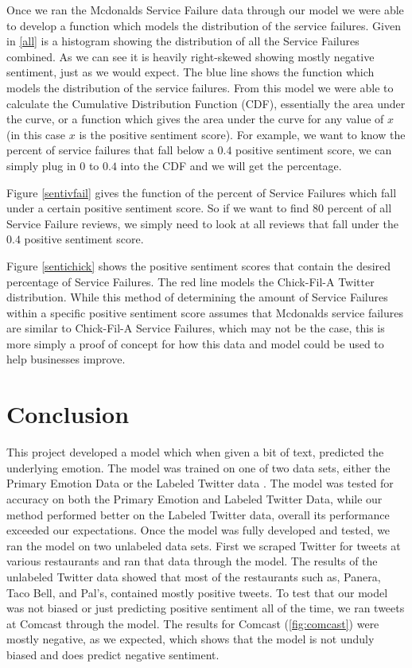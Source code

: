 \documentclass[titlepage,letterpaper]{article}
\begin{document}
Once we ran the Mcdonalds Service Failure data through our model we were able to develop a function which models the distribution of the service failures. Given in \cref{all} is a histogram showing the distribution of all the Service Failures combined. As we can see it is heavily right-skewed showing mostly negative sentiment, just as we would expect. The blue line shows the function which models the distribution of the service failures. From this model we were able to calculate the Cumulative Distribution Function (CDF), essentially the area under the curve, or a function which gives the area under the curve for any value of $x$ (in this case $x$ is the positive sentiment score). For example, we want to know the percent of service failures that fall below a $0.4$ positive sentiment score, we can simply plug in $0$ to $0.4$ into the CDF and we will get the percentage.

Figure \ref{sentivfail} gives the function of the percent of Service Failures which fall under a certain positive sentiment score. So if we want to find $80$ percent of all Service Failure reviews, we simply need to look at all reviews that fall under the $0.4$ positive sentiment score. 

Figure \ref{sentichick} shows the positive sentiment scores that contain the desired percentage of Service Failures. The red line models the Chick-Fil-A Twitter distribution. While this method of determining the amount of Service Failures within a specific positive sentiment score assumes that Mcdonalds service failures are similar to Chick-Fil-A Service Failures, which may not be the case, this is more simply a proof of concept for how this data and model could be used to help businesses improve.  

\section{Conclusion}
This project developed a model which when given a bit of text, predicted the underlying emotion. The model was trained on one of two data sets, either the Primary Emotion Data \cite{lowriwilliams} or the Labeled Twitter data \cite{LabeledTwitter}. The model was tested for accuracy on both the Primary Emotion and Labeled Twitter Data, while our method performed better on the Labeled Twitter data, overall its performance exceeded our expectations. Once the model was fully developed and tested, we ran the model on two unlabeled data sets. First we scraped Twitter for tweets at various restaurants and ran that data through the model. The results of the unlabeled Twitter data showed that most of the restaurants such as, Panera, Taco Bell, and Pal's, contained mostly positive tweets. To test that our model was not biased or just predicting positive sentiment all of the time, we ran tweets at Comcast through the model. The results for Comcast (\cref{fig:comcast}) were mostly negative, as we expected, which shows that the model is not unduly biased and does predict negative sentiment. 
\end{document}
